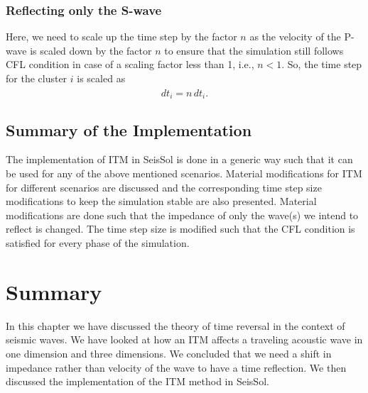 \subsubsection{Reflecting only the S-wave}
Here, we need to scale up the time step by the factor $n$ as the velocity of the P-wave is scaled down by the factor $n$ to ensure that the simulation still follows
\ac{CFL} condition in case of a scaling factor less than 1, i.e., $n < 1$. So, the time step for the cluster $i$ is scaled as
\begin{equation}
    \hat{dt}_i = n \, dt_i .
\end{equation}
\subsection{Summary of the Implementation}
The implementation of \ac{ITM} in SeisSol is done in a generic way such that it can be used for any of the above mentioned scenarios. 
Material modifications for \ac{ITM} for different scenarios are discussed and the corresponding time step size modifications to keep the simulation
stable are also presented. Material modifications are done such that the impedance of only the wave(s) we intend to reflect is changed. 
The time step size is modified such that the \ac{CFL} condition is satisfied for every phase of the simulation. 

\section{Summary}
In this chapter we have discussed the theory of time reversal in the context of seismic waves. We have looked at how an \ac{ITM} affects a traveling acoustic
wave in one dimension and three dimensions. We concluded that we need a shift in impedance rather than velocity of the wave to have a time reflection. We then discussed
the implementation of the \ac{ITM} method in SeisSol.
